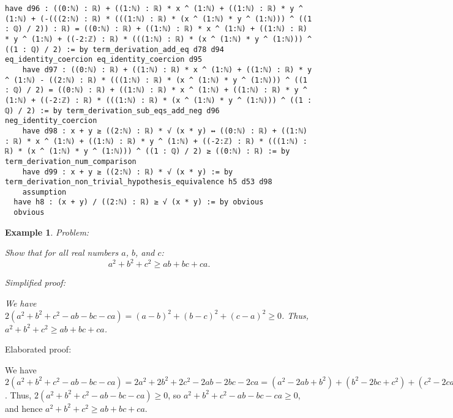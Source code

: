 \documentclass{article}
\newtheorem{example}{Example}
\begin{document}
\begin{tcolorbox}[colback=white!10, width=\linewidth]
\begin{lstlisting}[language=Lean4]
    have d96 : ((0:ℕ) : ℝ) + ((1:ℕ) : ℝ) * x ^ (1:ℕ) + ((1:ℕ) : ℝ) * y ^ (1:ℕ) + (-(((2:ℕ) : ℝ) * (((1:ℕ) : ℝ) * (x ^ (1:ℕ) * y ^ (1:ℕ))) ^ ((1 : ℚ) / 2)) : ℝ) = ((0:ℕ) : ℝ) + ((1:ℕ) : ℝ) * x ^ (1:ℕ) + ((1:ℕ) : ℝ) * y ^ (1:ℕ) + ((-2:ℤ) : ℝ) * (((1:ℕ) : ℝ) * (x ^ (1:ℕ) * y ^ (1:ℕ))) ^ ((1 : ℚ) / 2) := by term_derivation_add_eq d78 d94 eq_identity_coercion eq_identity_coercion d95
    have d97 : ((0:ℕ) : ℝ) + ((1:ℕ) : ℝ) * x ^ (1:ℕ) + ((1:ℕ) : ℝ) * y ^ (1:ℕ) - ((2:ℕ) : ℝ) * (((1:ℕ) : ℝ) * (x ^ (1:ℕ) * y ^ (1:ℕ))) ^ ((1 : ℚ) / 2) = ((0:ℕ) : ℝ) + ((1:ℕ) : ℝ) * x ^ (1:ℕ) + ((1:ℕ) : ℝ) * y ^ (1:ℕ) + ((-2:ℤ) : ℝ) * (((1:ℕ) : ℝ) * (x ^ (1:ℕ) * y ^ (1:ℕ))) ^ ((1 : ℚ) / 2) := by term_derivation_sub_eqs_add_neg d96 neg_identity_coercion
    have d98 : x + y ≥ ((2:ℕ) : ℝ) * √ (x * y) ↔ ((0:ℕ) : ℝ) + ((1:ℕ) : ℝ) * x ^ (1:ℕ) + ((1:ℕ) : ℝ) * y ^ (1:ℕ) + ((-2:ℤ) : ℝ) * (((1:ℕ) : ℝ) * (x ^ (1:ℕ) * y ^ (1:ℕ))) ^ ((1 : ℚ) / 2) ≥ ((0:ℕ) : ℝ) := by term_derivation_num_comparison
    have d99 : x + y ≥ ((2:ℕ) : ℝ) * √ (x * y) := by term_derivation_non_trivial_hypothesis_equivalence h5 d53 d98
    assumption
  have h8 : (x + y) / ((2:ℕ) : ℝ) ≥ √ (x * y) := by obvious
  obvious

\end{lstlisting}
\end{tcolorbox}


\begin{example}
Problem:
\begin{tcolorbox}[colback=yellow!10, width=\linewidth]
Show that for all real numbers $a$, $b$, and $c$:
    $$a^2 + b^2 + c^2 \geq ab + bc + ca.$$
\end{tcolorbox}

Simplified proof:
\begin{tcolorbox}[colback=blue!10, width=\linewidth]
We have $2(a^2 + b^2 + c^2 - ab - bc - ca) = (a-b)^2 + (b-c)^2 + (c-a)^2 \ge 0$. Thus, $a^2 + b^2 + c^2 \geq ab + bc + ca$.
\end{tcolorbox}
\end{example}

Elaborated proof:
\begin{tcolorbox}[colback=green!10, width=\linewidth]
We have $2(a^2 + b^2 + c^2 - ab - bc - ca) = 2a^2 + 2b^2 + 2c^2 - 2ab - 2bc - 2ca = (a^2 - 2ab + b^2) + (b^2 - 2bc + c^2) + (c^2 - 2ca + a^2) = (a-b)^2 + (b-c)^2 + (c-a)^2 \ge 0$. Thus, $2(a^2 + b^2 + c^2 - ab - bc - ca) \ge 0$, so $a^2 + b^2 + c^2 - ab - bc - ca \ge 0$, and hence $a^2 + b^2 + c^2 \geq ab + bc + ca$.
\end{tcolorbox}
\end{document}
